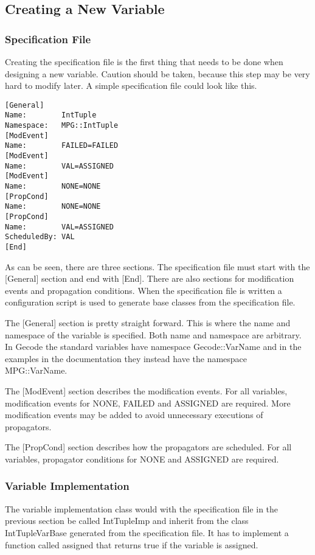 \documentclass[a4paper,11pt]{article}
\begin{document}
\subsection{Creating a New Variable}
\subsubsection{Specification File}
Creating the specification file is the first thing that needs to be done when designing a new variable. Caution should be taken, because this step may be very hard to modify later. A simple specification file could look like this.

\begin{lstlisting}[frame=single]
[General]
Name:        IntTuple
Namespace:   MPG::IntTuple
[ModEvent]
Name:        FAILED=FAILED
[ModEvent]
Name:        VAL=ASSIGNED
[ModEvent]
Name:        NONE=NONE
[PropCond]
Name:        NONE=NONE
[PropCond]
Name:        VAL=ASSIGNED
ScheduledBy: VAL
[End]
\end{lstlisting}

As can be seen, there are three sections. The specification file must start with the [General] section and end with [End]. There are also sections for modification events and propagation conditions. When the specification file is written a configuration script is used to generate base classes from the specification file.

The [General] section is pretty straight forward. This is where the name and namespace of the variable is specified. Both name and namespace are arbitrary. In Gecode the standard variables have namespace Gecode::VarName and in the examples in the documentation they instead have the namespace MPG::VarName.

The [ModEvent] section describes the modification events. For all variables, modification events for NONE, FAILED and ASSIGNED are required. More modification events may be added to avoid unnecessary executions of propagators. 

The [PropCond] section describes how the propagators are scheduled. For all variables, propagator conditions for NONE and ASSIGNED are required.

\subsubsection{Variable Implementation}
The variable implementation class would with the specification file in the previous section be called IntTupleImp and inherit from the class IntTupleVarBase generated from the specification file. It has to implement a function called assigned that returns true if the variable is assigned.
\end{document}
